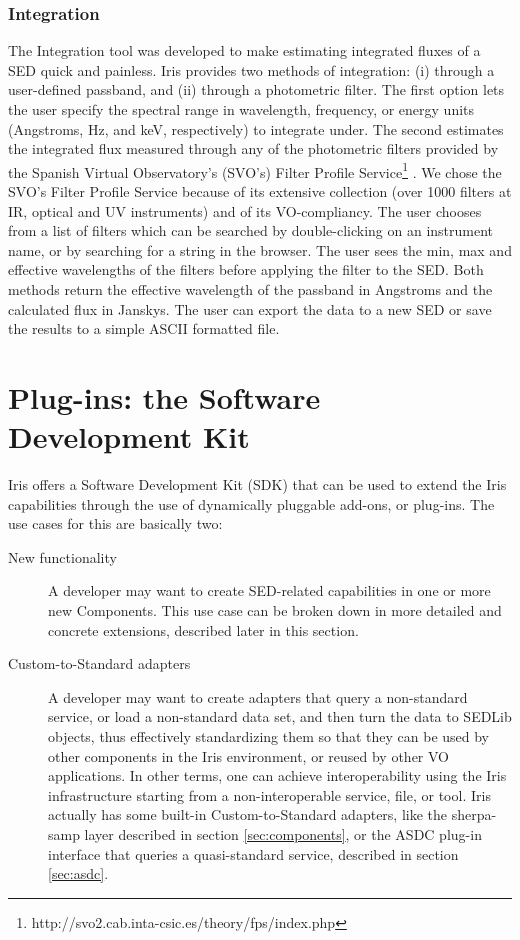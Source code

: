 \documentclass[final,5p]{elsarticle}
\begin{document}
\subsubsection{Integration}
The Integration tool was developed to make estimating integrated fluxes of a SED quick and painless. Iris provides two methods of integration: (i) through a user-defined passband, and (ii) through a photometric filter. The first option lets the user specify the spectral range in wavelength, frequency, or energy units (Angstroms, Hz, and keV, respectively) to integrate under. The second estimates the integrated flux measured through any of the photometric filters provided by the Spanish Virtual Observatory's (SVO's) Filter Profile Service\footnote{http://svo2.cab.inta-csic.es/theory/fps/index.php} \citep{2013arXiv1312.3249S}. We chose the SVO's Filter Profile Service because of its extensive collection (over 1000 filters at IR, optical and UV instruments) and of its VO-compliancy. The user chooses from a list of filters which can be searched by double-clicking on an instrument name, or by searching for a string in the browser. The user sees the min, max and effective wavelengths of the filters before applying the filter to the SED.
Both methods return the effective wavelength of the passband in Angstroms and the calculated flux in Janskys. The user can export the data to a new SED or save the results to a simple ASCII formatted file.

\section{Plug-ins: the Software Development Kit}
\label{sec:plugins}

Iris offers a Software Development Kit (SDK) that can be used to extend the Iris capabilities through the use of dynamically pluggable add-ons, or plug-ins.
The use cases for this are basically two:
\begin{description}
\item[New functionality] A developer may want to create SED-related capabilities in one or more new Components. This use case can be broken down in more detailed and concrete extensions, described later in this section.
\item[Custom-to-Standard adapters] A developer may want to create adapters that query a non-standard service, or load a non-standard data set, and then turn the data to SEDLib objects, thus effectively standardizing them so that they can be used by other components in the Iris environment, or reused by other VO applications. In other terms, one can achieve interoperability using the Iris infrastructure starting from a non-interoperable service, file, or tool. Iris actually has some built-in Custom-to-Standard adapters, like the sherpa-samp layer described in section \ref{sec:components}, or the ASDC plug-in interface that queries a quasi-standard service, described in section \ref{sec:asdc}.
\end{description}
\end{document}
